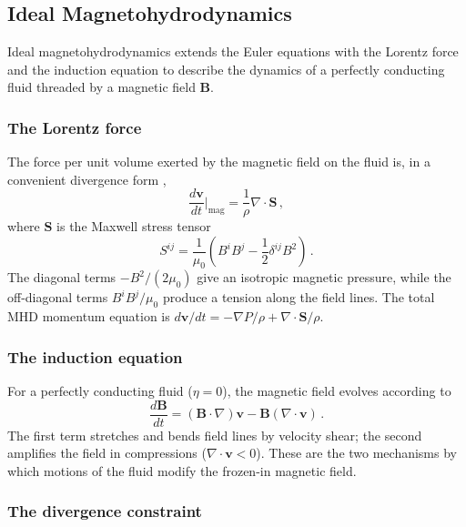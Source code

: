 \subsection{Ideal Magnetohydrodynamics}
\label{sec:mhd}

Ideal magnetohydrodynamics extends the Euler equations with the Lorentz force and the induction equation to describe the dynamics of a perfectly conducting fluid threaded by a magnetic field $\mathbf{B}$.


\subsubsection*{The Lorentz force}

The force per unit volume exerted by the magnetic field on the fluid is, in a convenient divergence form \cite{Wissing2020},
\begin{equation}
    \frac{d\mathbf{v}}{dt}\bigg|_\mathrm{mag} = \frac{1}{\rho} \nabla \cdot \mathbf{S}\,,
    \label{eq:lorentz}
\end{equation}
where $\mathbf{S}$ is the Maxwell stress tensor
\begin{equation}
    S^{ij} = \frac{1}{\mu_0}\left(B^i B^j - \frac{1}{2}\delta^{ij} B^2\right)\,.
    \label{eq:maxwell_stress}
\end{equation}
The diagonal terms $-B^2/(2\mu_0)$ give an isotropic magnetic pressure, while the off-diagonal terms $B^i B^j/\mu_0$ produce a tension along the field lines. The total MHD momentum equation is $d\mathbf{v}/dt = -\nabla P/\rho + \nabla \cdot \mathbf{S}/\rho$.


\subsubsection*{The induction equation}

For a perfectly conducting fluid ($\eta = 0$), the magnetic field evolves according to \cite{Wissing2020}
\begin{equation}
    \frac{d\mathbf{B}}{dt} = (\mathbf{B} \cdot \nabla)\mathbf{v} - \mathbf{B}(\nabla \cdot \mathbf{v})\,.
    \label{eq:induction}
\end{equation}
The first term stretches and bends field lines by velocity shear; the second amplifies the field in compressions ($\nabla \cdot \mathbf{v} < 0$). These are the two mechanisms by which motions of the fluid modify the frozen-in magnetic field.


\subsubsection*{The divergence constraint}

